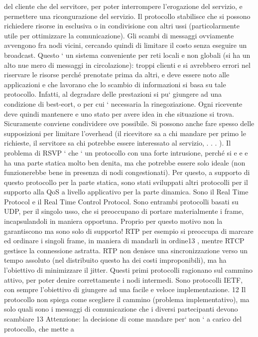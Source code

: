 \documentclass[a4paper,12pt]{article}
\begin{document}
del cliente che del servitore, per poter interrompere l'erogazione del servizio,
e permettere una ricongurazione del servizio. Il protocollo stabilisce che si
possono richiedere risorse in esclusiva o in condivisione con altri ussi (particolarmente utile per ottimizzare la
comunicazione). Gli scambi di messaggi
ovviamente avvengono fra nodi vicini, cercando quindi di limitare il costo senza
eseguire un broadcast.
Questo ` un sistema conveniente per reti locali e non globali (si ha un alto nue
mero di messaggi in circolazione): troppi clienti e si avrebbero errori nel riservare
le risorse perché prenotate prima da altri, e deve essere noto alle applicazioni
e
che lavorano che lo scambio di informazioni si basa su tale protocollo. Infatti,
al degradare delle prestazioni si pu` giungere ad una condizione di best-eort,
o
per cui ` necessaria la rinegoziazione. Ogni ricevente deve quindi mantenere
e
uno stato per avere idea in che situazione si trova. Sicuramente conviene condividere ove possibile. Si possono anche
fare spesso delle supposizioni per limitare
l'overhead (il ricevitore sa a chi mandare per primo le richieste, il servitore sa
chi potrebbe essere interessato al servizio, . . . ).
Il problema di RSVP ` che ` un protocollo con una forte intrusione, perché si
e
e
e
ha una parte statica molto ben denita, ma che potrebbe essere solo ideale (non
funzionerebbe bene in presenza di nodi congestionati). Per questo, a supporto
di questo protocollo per la parte statica, sono stati sviluppati altri protocolli
per il supporto alla QoS a livello applicativo per la parte dinamica. Sono il Real
Time Protocol e il Real Time Control Protocol. Sono entrambi protocolli basati
su UDP, per il singolo usso, che si preoccupano di portare materialmente i
frame, incapsulandoli in maniera opportuna. Proprio per questo motivo non
la garantiscono ma sono solo di supporto! RTP per esempio si preoccupa di
marcare ed ordinare i singoli frame, in maniera di mandarli in ordine13 , mentre
RTCP gestisce la connessione astratta.
RTP non denisce una sincronizzazione verso un tempo assoluto (nel distribuito questo ha dei costi improponibili), ma ha
l'obiettivo di minimizzare il
jitter. Questi primi protocolli ragionano sul cammino attivo, per poter denire
correttamente i nodi intermedi. Sono protocolli IETF, con sempre l'obiettivo di
giungere ad una facile e veloce implementazione.
12 Il protocollo non spiega come scegliere il cammino (problema implementativo), ma solo
quali sono i messaggi di comunicazione che i diversi partecipanti devono scambiare
13 Attenzione: la decisione di come mandare per` non ` a carico del protocollo, che mette a
\end{document}

